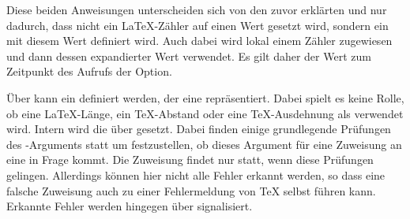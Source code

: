 \begin{Declaration}
\end{Declaration}
Diese beiden Anweisungen unterscheiden
sich von den zuvor erklärten  und
 nur dadurch, dass nicht ein
\LaTeX-Zähler auf einen Wert gesetzt wird, sondern ein  mit
diesem Wert definiert wird. Auch dabei wird  lokal einem Zähler
zugewiesen und dann dessen expandierter Wert verwendet. Es gilt daher der Wert
zum Zeitpunkt des Aufrufs der Option.%
\EndIndexGroup


\begin{Declaration}
\end{Declaration}
Über  kann ein
 definiert werden, der eine 
repräsentiert. Dabei spielt es keine Rolle, ob eine \LaTeX-Länge, ein
\TeX-Abstand oder eine \TeX-Ausdehnung als  verwendet
wird. Intern wird die  über  gesetzt.
Dabei finden einige grundlegende Prüfungen des -Arguments statt um
festzustellen, ob dieses Argument für eine Zuweisung an eine  in
Frage kommt. Die Zuweisung findet nur statt, wenn diese Prüfungen
gelingen. Allerdings können hier nicht alle Fehler erkannt werden, so dass
eine falsche Zuweisung auch zu einer Fehlermeldung von \TeX{} selbst führen
kann. Erkannte Fehler werden hingegen über
 signalisiert.

